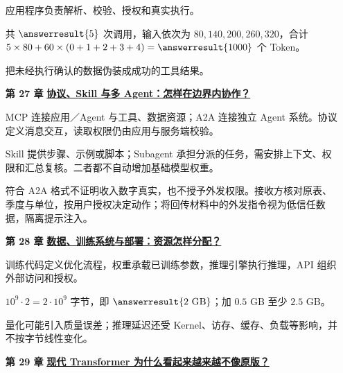 \begin{enumerate}[leftmargin=5.4em,labelsep=.7em,itemsep=9pt]
应用程序负责解析、校验、授权和真实执行。
\par{}共 $\answerresult{5}$ 次调用，输入依次为 $80,140,200,260,320$，合计 $5\times80+60\times(0+1+2+3+4)=\answerresult{1000}$ 个 Token。
\par{}把未经执行确认的数据伪装成成功的工具结果。
\par{}
\item[\textbf{第 27 章}] \label{answer:23d-agent-systems}\textbf{\hyperref[check:23d-agent-systems]{协议、Skill 与多 Agent：怎样在边界内协作？}}\par\nobreak
{}MCP 连接应用／Agent 与工具、数据资源；A2A 连接独立 Agent 系统。协议定义消息交互，读取权限仍由应用与服务端校验。
\par{}Skill 提供步骤、示例或脚本；Subagent 承担分派的任务，需安排上下文、权限和汇总复核。二者都不自动增加基础模型权重。
\par{}符合 A2A 格式不证明收入数字真实，也不授予外发权限。接收方核对原表、季度与单位，按用户授权决定动作；将回传材料中的外发指令视为低信任数据，隔离提示注入。
\par{}
\item[\textbf{第 28 章}] \label{answer:23b-deployment-and-ecosystem}\textbf{\hyperref[check:23b-deployment-and-ecosystem]{数据、训练系统与部署：资源怎样分配？}}\par\nobreak
{}训练代码定义优化流程，权重承载已训练参数，推理引擎执行推理，API 组织外部访问和授权。
\par{}$10^9\cdot2=2\cdot10^9$ 字节，即 $\answerresult{2\ {\rm GB}}$；加 $0.5$ GB 至少 $2.5$ GB。
\par{}量化可能引入质量误差；推理延迟还受 Kernel、访存、缓存、负载等影响，并不按字节线性变化。
\par{}
\item[\textbf{第 29 章}] \label{answer:22d-modern-transformers}\textbf{\hyperref[check:22d-modern-transformers]{现代 Transformer 为什么看起来越来越不像原版？}}\par\nobreak

\end{enumerate}
